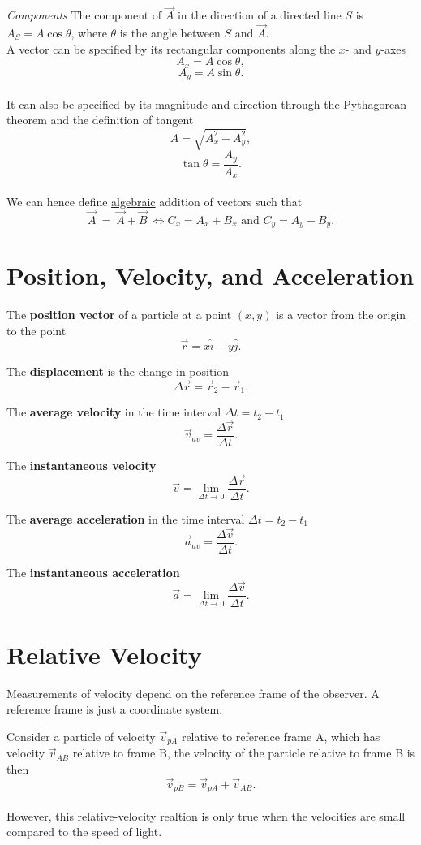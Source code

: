 \documentclass[11pt,a4paper]{report}
\begin{document}
\hspace{1mm}

\noindent
\textit{Components} The component of $\vec{A}$ in the direction of a directed line $S$ is $A_S = A\cos{\theta}$, where $\theta$ is the angle between $S$ and $\vec{A}$.\\A vector can be specified by its rectangular components along the $x$- and $y$-axes $$A_x = A\cos{\theta},$$ $$A_y = A\sin{\theta}.$$\\It can also be specified by its magnitude and direction through the Pythagorean theorem and the definition of tangent $$A=\sqrt{A_x^2 + A_y^2},$$ $$\tan{\theta} = \frac{A_y}{A_x}.$$\\We can hence define \underline{algebraic} addition of vectors such that $$\vec{A}\ =\ \vec{A} + \vec{B}\ \Longleftrightarrow C_x = A_x + B_x \textrm{ and } C_y = A_y + B_y.$$

\section*{Position, Velocity, and Acceleration}

The \textbf{position vector} of a particle at a point $\left(x, y\right)$ is a vector from the origin to the point $$\vec{r} = x\hat{i} + y\hat{j}.$$

\noindent
The \textbf{displacement} is the change in position $$\Delta{\vec{r}} = \vec{r}_2 - \vec{r}_1.$$

\noindent
The \textbf{average velocity} in the time interval $\Delta{t} = t_2 - t_1$ $$\vec{v}_{av} = \frac{\Delta{\vec{r}}}{\Delta{t}}.$$

\noindent
The \textbf{instantaneous velocity} $$\vec{v} = \lim_{\Delta{t} \to 0} \frac{\Delta{\vec{r}}}{\Delta{t}}.$$

\noindent
The \textbf{average acceleration} in the time interval $\Delta{t} = t_2 - t_1$ $$\vec{a}_{av} = \frac{\Delta{\vec{v}}}{\Delta{t}}.$$

\noindent
The \textbf{instantaneous acceleration} $$\vec{a} = \lim_{\Delta{t} \to 0} \frac{\Delta{\vec{v}}}{\Delta{t}}.$$

\section*{Relative Velocity}

Measurements of velocity depend on the reference frame of the observer. A reference frame is just a coordinate system.

\noindent
Consider a particle of velocity $\vec{v}_{pA}$ relative to reference frame A, which has velocity $\vec{v}_{AB}$ relative to frame B, the velocity of the particle relative to frame B is then $$\vec{v}_{pB} = \vec{v}_{pA} + \vec{v}_{AB}.$$\\However, this relative-velocity realtion is only true when the velocities are small compared to the speed of light.
\end{document}
